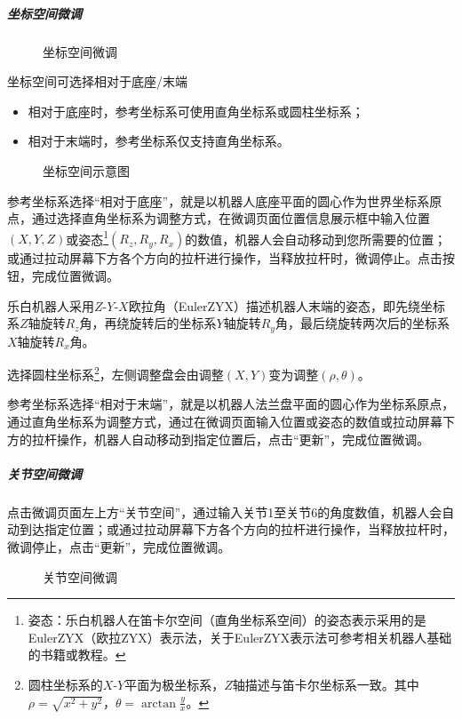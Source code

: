 \subparagraph{坐标空间微调}

\begin{figure}[ht]
	\centering
	\color{red}{缺图}
	\caption{坐标空间微调}
	\label{fig:坐标空间微调}
\end{figure}

坐标空间可选择相对于底座/末端
\begin{itemize}
	\item 相对于底座时，参考坐标系可使用直角坐标系或圆柱坐标系；
	\item 相对于末端时，参考坐标系仅支持直角坐标系。
\end{itemize}

\begin{figure}[ht]
	\centering
	\color{red}{缺图}
	\caption{坐标空间示意图}
	\label{fig:坐标空间示意图}
\end{figure}

参考坐标系选择“相对于底座”，就是以机器人底座平面的圆心作为世界坐标系原点，通过选择直角坐标系为调整方式，在微调页面位置信息展示框中输入位置$(X, Y, Z)$或姿态\footnote{姿态：乐白机器人在笛卡尔空间（直角坐标系空间）的姿态表示采用的是EulerZYX（欧拉ZYX）表示法，关于EulerZYX表示法可参考相关机器人基础的书籍或教程。}$(R_z, R_y, R_x)$的数值，机器人会自动移动到您所需要的位置；或通过拉动屏幕下方各个方向的拉杆进行操作，当释放拉杆时，微调停止。点击按钮，完成位置微调。

乐白机器人采用$Z\textrm{-}Y\textrm{-}X$欧拉角（EulerZYX）描述机器人末端的姿态，即先绕坐标系$Z$轴旋转$R_z$角，再绕旋转后的坐标系$Y$轴旋转$R_y$角，最后绕旋转两次后的坐标系$X$轴旋转$R_x$角。

选择圆柱坐标系\footnote{圆柱坐标系的$X\textrm{-}Y$平面为极坐标系，$Z$轴描述与笛卡尔坐标系一致。其中 $\rho=\sqrt{x^2+y^2}$，$\theta=\arctan\frac{y}{x}$。}，左侧调整盘会由调整$(X, Y)$变为调整$(\rho, \theta)$。

参考坐标系选择“相对于末端”，就是以机器人法兰盘平面的圆心作为坐标系原点，通过直角坐标系为调整方式，通过在微调页面输入位置或姿态的数值或拉动屏幕下方的拉杆操作，机器人自动移动到指定位置后，点击“更新”，完成位置微调。

\subparagraph{关节空间微调}
点击微调页面左上方“关节空间”，通过输入关节1至关节6的角度数值，机器人会自动到达指定位置；或通过拉动屏幕下方各个方向的拉杆进行操作，当释放拉杆时，微调停止，点击“更新”，完成位置微调。

\begin{figure}[ht]
	\centering
	\color{red}{缺图}
	\caption{关节空间微调}
	\label{fig:关节空间微调}
\end{figure}


